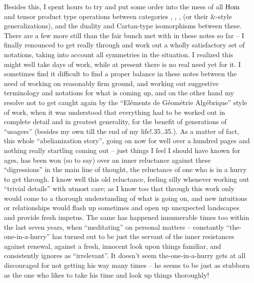 Besides this, I spent hours to try and put some order into
the mess of all $\operatorname{Hom}$ and tensor product type operations between
categories \Ahatk, \AhatM, \Bhatk, \BhatM{} (or their $\&$-style
generalizations), and the duality and Cartan-type isomorphisms between
these. There are a few more still than the fair bunch met with in
these notes so far -- I finally renounced to get really through and
work out a wholly satisfactory set of notations, taking into account
all symmetries in the situation. I realized this might well take days
of work, while at present there is no real need yet for it. I
sometimes find it difficult to find a proper balance in these notes
between the need of working on reasonably firm ground, and working out
suggestive terminology and notations for what is coming up, and on the
other hand my resolve not to get caught again by the ``Eléments de
Géométrie Algébrique'' style of work, when it was understood that
everything had to be worked out in complete detail and in greatest
generality, for the benefit of generations of
``usagers'' (besides my own till the end of my
life!\kern.35\font.\kern.35\font.). As a matter
of fact, this whole ``abelianization story'', going on now for well
over a hundred pages and nothing really startling coming out -- just
things I feel I should have known for ages, has been won (so to say)
over an inner reluctance against these ``digressions'' in the main
line of thought, the reluctance of one who is in a hurry to get
through. I know well this old reluctance, feeling silly whenever
working out ``trivial details'' with utmost care; as I know too that
through this work only would come to a thorough understanding of what
is going on, and new intuitions or relationships would flash up
sometimes and open up unexpected landscapes and provide fresh
impetus. The same has happened innumerable times too within the last
seven years, when ``meditating'' on personal matters -- constantly
``the-one-in-a-hurry'' has turned out to be just the servant of the
inner resistances against renewal, against a fresh, innocent look upon
things familiar, and consistently ignores as ``irrelevant''. It
doesn't seem the-one-in-a-hurry gets at all discouraged for not
getting his way many times -- he seems to be just as stubborn as the
one who likes to take his time and look up things thoroughly!

\bigbreak

\presectionfill{}\par

